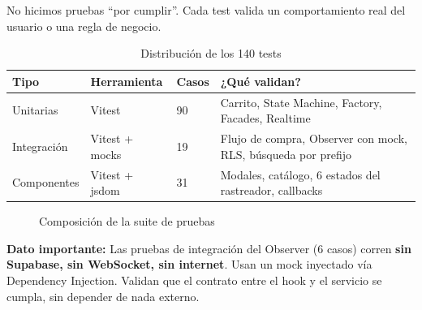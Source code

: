 \documentclass[12pt,a4paper]{article}
\begin{document}
No hicimos pruebas ``por cumplir''. Cada test valida un comportamiento real del usuario o una regla de negocio.

\begin{table}[H]
\centering
{}
\small
\begin{tabular}{p{2cm} p{3cm} p{1.4cm} p{6cm}}
\toprule
\rowcolor{mateo!20}\textbf{Tipo} & \textbf{Herramienta} & \textbf{Casos} & \textbf{¿Qué validan?} \\
\midrule
Unitarias & Vitest & 90 & Carrito, State Machine, Factory, Facades, Realtime \\
Integración & Vitest + mocks & 19 & Flujo de compra, Observer con mock, RLS, búsqueda por prefijo \\
Componentes & Vitest + jsdom & 31 & Modales, catálogo, 6 estados del rastreador, callbacks \\
\bottomrule
\end{tabular}
\caption{Distribución de los 140 tests}
\end{table}

\begin{figure}[H]
\centering
{}
\caption{Composición de la suite de pruebas}
\end{figure}

\begin{tipbox}
\textbf{Dato importante:} Las pruebas de integración del Observer (6 casos) corren \textbf{sin Supabase, sin WebSocket, sin internet}. Usan un mock inyectado vía Dependency Injection. Validan que el contrato entre el hook y el servicio se cumpla, sin depender de nada externo.
\end{tipbox}
\end{document}
